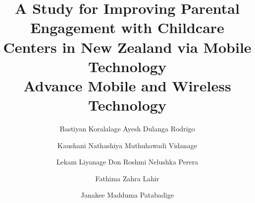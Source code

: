 \begin{titlepage}
\centering
\title{A Study for Improving Parental Engagement with Childcare Centers in New Zealand via Mobile Technology \\
  \large Advance Mobile and Wireless Technology}


\author{{Bastiyan Koralalage Ayesh Dulanga Rodrigo}
{}}
 
\author{Kaushani Nathashiya Muthuhawadi Vidanage}
\author{Lekam Liyanage Don Roshmi Nelushka Perera}
\author{Fathima Zahra Lahir}
\author{Janakee Madduma Patabadige}


\address{Faculty of Information Technology, Eastern Institute of Technology, Auckland 2024, New Zealand}

\end{titlepage}
